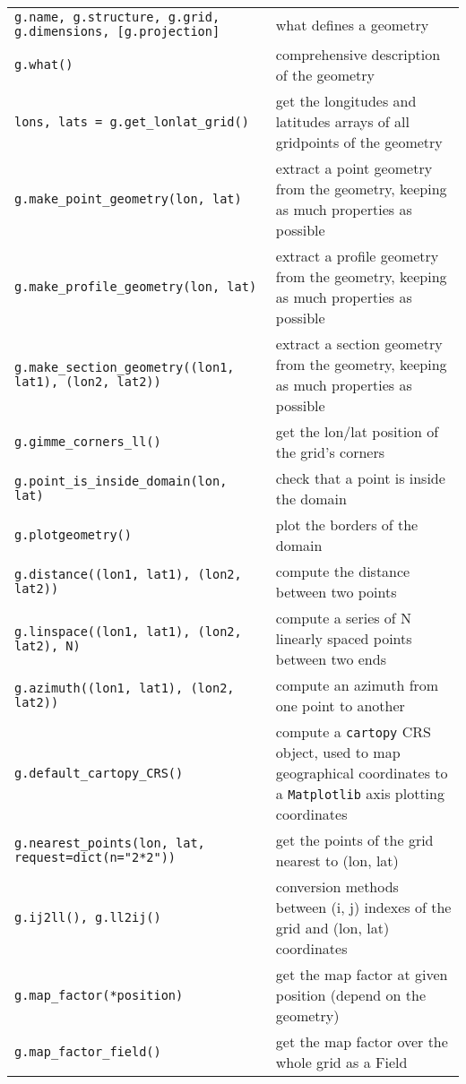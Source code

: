 \documentclass[a4paper,10pt]{article}
\begin{document}
\begin{tabular}{|p{9.5cm}|p{9.5cm}|}
\hline
\rowcolor{gray!50}
\multicolumn{2}{|c|}{\textbf{Geometries}}\\
\hline
\texttt{g.name, g.structure, g.grid, g.dimensions, [g.projection]} & what defines a geometry\\
\texttt{g.what()} & comprehensive description of the geometry\\
\texttt{lons, lats = g.get\_lonlat\_grid()} & get the longitudes and latitudes arrays of all gridpoints of the geometry\\
\texttt{g.make\_point\_geometry(lon, lat)} & extract a point geometry from the geometry, keeping as much properties as possible\\
\texttt{g.make\_profile\_geometry(lon, lat)} & extract a profile geometry from the geometry, keeping as much properties as possible\\
\texttt{g.make\_section\_geometry((lon1, lat1), (lon2, lat2))} & extract a section geometry from the geometry, keeping as much properties as possible\\
\texttt{g.gimme\_corners\_ll()} & get the lon/lat position of the grid's corners\\
\texttt{g.point\_is\_inside\_domain(lon, lat)} & check that a point is  inside the domain\\
\texttt{g.plotgeometry()} & plot the borders of the domain\\
\texttt{g.distance((lon1, lat1), (lon2, lat2))} & compute the distance between two points\\
\texttt{g.linspace((lon1, lat1), (lon2, lat2), N)} & compute a series of N linearly spaced points between two ends\\
\texttt{g.azimuth((lon1, lat1), (lon2, lat2))} & compute an azimuth from one point to another\\
\texttt{g.default\_cartopy\_CRS()} & compute a \texttt{cartopy} CRS object, used to map geographical coordinates to a \texttt{Matplotlib} axis plotting coordinates\\
\texttt{g.nearest\_points(lon, lat, request=dict(n="2*2"))} & get the points of the grid nearest to (lon, lat)\\
\texttt{g.ij2ll(), g.ll2ij()} & conversion methods between (i, j) indexes of the grid and (lon, lat) coordinates\\
\texttt{g.map\_factor(*position)} & get the map factor at given position (depend on the geometry)\\
\texttt{g.map\_factor\_field()} & get the map factor over the whole grid as a Field\\

\end{tabular}
\end{document}
